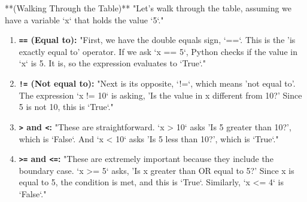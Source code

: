 \documentclass{beamer}
\begin{document}
\begin{frame}[fragile]
{        **(Walking Through the Table)**
        "Let's walk through the table, assuming we have a variable `x` that holds the value `5`."
        \begin{enumerate}
            \item \textbf{\texttt{==} (Equal to):} "First, we have the double equals sign, `==`. This is the 'is exactly equal to' operator. If we ask `x == 5`, Python checks if the value in `x` is 5. It is, so the expression evaluates to `True`."
            \item \textbf{\texttt{!=} (Not equal to):} "Next is its opposite, `!=`, which means 'not equal to'. The expression `x != 10` is asking, 'Is the value in x different from 10?' Since 5 is not 10, this is `True`."
            \item \textbf{\texttt{>} and \texttt{<}:} "These are straightforward. `x > 10` asks 'Is 5 greater than 10?', which is `False`. And `x < 10` asks 'Is 5 less than 10?', which is `True`."
            \item \textbf{\texttt{>=} and \texttt{<=}:} "These are extremely important because they include the boundary case. `x >= 5` asks, 'Is x greater than OR equal to 5?' Since x is equal to 5, the condition is met, and this is `True`. Similarly, `x <= 4` is `False`."
        \end{enumerate}
    }
\end{frame}
\end{document}

